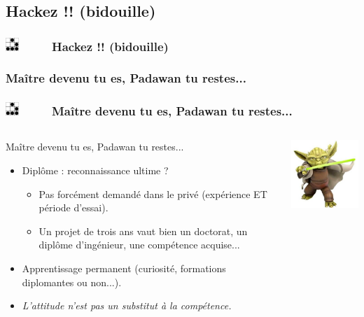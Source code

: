 \documentclass[slidetop,11pt]{beamer}
\def\sectionPartIIIb{Hackez !! (bidouille)}
\def\sectionPartIIIbUN{Ma{\^i}tre devenu tu es, Padawan tu restes...}
\def\moreInFrameTitle{\includegraphics[height=0.5cm]{img/logo_glider.png}~~~~~}
\begin{document}
\subsection{\sectionPartIIIb}
\begin{frame}
	\frametitle{\moreInFrameTitle \sectionPartIIIb}
	\tableofcontents[sections=3,subsectionstyle=show/shaded/hide,subsubsectionstyle=show/show/hide]
\end{frame} 

\subsubsection{\sectionPartIIIbUN}
\begin{frame}
	\frametitle{\moreInFrameTitle \sectionPartIIIbUN}
	\begin{columns}[c]
	\begin{column}[c]{7cm}
		 \begin{beamerboxesrounded}	[lower=substructureUN, %
		 				 upper=block title UN,%
						 shadow=true]%
		       {\sectionPartIIIbUN}
			\begin{itemize}
				\item Dipl{\^o}me : reconnaissance ultime ?
				\begin{itemize}
					\item Pas forc{\'e}ment demand{\'e} dans le priv{\'e} (exp{\'e}rience ET p{\'e}riode d'essai). 
					\item Un projet de trois ans vaut bien un doctorat, un dipl{\^o}me d'ing{\'e}nieur, une comp{\'e}tence acquise...
				\end{itemize}
				\item Apprentissage permanent (curiosit{\'e}, formations diplomantes ou non...). 
				\item \emph{L'attitude n'est pas un substitut {\`a} la comp{\'e}tence. }
			\end{itemize}
		\end{beamerboxesrounded}
	\end{column}
	\begin{column}[c]{4cm}
		\includegraphics[width=4cm]{img/yodaInCloneWars.png}~\\
	\end{column}
	\end{columns}
\end{frame} 
\end{document}
